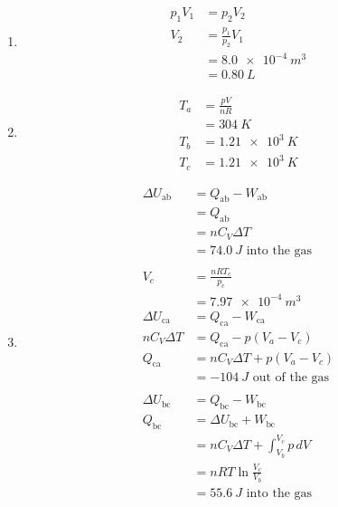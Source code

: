 \documentclass{article}
\begin{document}
\begin{enumerate}
  \item

        \begin{align*}
          p_1 V_1 & = p_2 V_2             \\
          V_2     & = \frac{p_1}{p_2} V_1 \\
                  & = \qty{8.0e-4}{m^3}   \\
                  & = \qty{0.80}{L}
        \end{align*}

  \item

        \begin{align*}
          T_a & = \frac{p V}{n R} \\
              & = \qty{304}{K}    \\
          T_b & = \qty{1.21e3}{K} \\
          T_c & = \qty{1.21e3}{K}
        \end{align*}

  \item

        \begin{align*}
          \Delta U_\text{ab} & = Q_\text{ab} - W_\text{ab}                 \\
                             & = Q_\text{ab}                               \\
                             & = n C_V \Delta T                            \\
                             & = \qty{74.0}{J} \text{ into the gas}        \\ \\
          V_c                & = \frac{n R T_c}{p_c}                       \\
                             & = \qty{7.97e-4}{m^3}                        \\
          \Delta U_\text{ca} & = Q_\text{ca} - W_\text{ca}                 \\
          n C_V \Delta T     & = Q_\text{ca} - p (V_a - V_c)               \\
          Q_\text{ca}        & = n C_V \Delta T + p (V_a - V_c)            \\
                             & = \qty{-104}{J} \text{ out of the gas}      \\ \\
          \Delta U_\text{bc} & = Q_\text{bc} - W_\text{bc}                 \\
          Q_\text{bc}        & = \Delta U_\text{bc} + W_\text{bc}          \\
                             & = n C_V \Delta T + \int_{V_b}^{V_c} p \,d V \\
                             & = n R T \ln \frac{V_c}{V_b}                 \\
                             & = \qty{55.6}{J} \text{ into the gas}
        \end{align*}


\end{enumerate}
\end{document}
